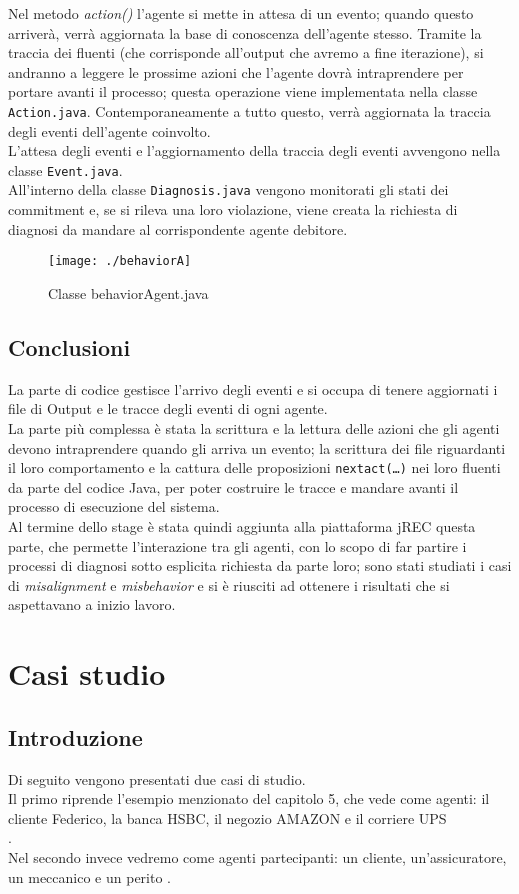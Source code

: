 \documentclass[a4paper,12pt]{report}
\begin{document}
Nel metodo \textit{action()} l'agente si mette in attesa di un evento; quando questo arriverà, verrà aggiornata la base di conoscenza dell'agente stesso. Tramite la traccia dei fluenti (che corrisponde all'output che avremo a fine iterazione), si andranno a leggere le prossime azioni che l'agente dovrà intraprendere per portare avanti il processo; questa operazione viene implementata nella classe \texttt{Action.java}. Contemporaneamente a tutto questo, verrà aggiornata la traccia degli eventi dell'agente coinvolto.\\
L'attesa degli eventi e l'aggiornamento della traccia degli eventi avvengono nella classe \texttt{Event.java}.\\
All'interno della classe \texttt{Diagnosis.java} vengono monitorati gli stati dei commitment e, se si rileva una loro violazione, viene creata la richiesta di diagnosi da mandare al corrispondente agente debitore.
\newpage
\begin{figure}[h]
    \texttt{[image: ./behaviorA]}
    \caption{Classe behaviorAgent.java}
    \label{output}
\end{figure}
\newpage
\section{Conclusioni}
La parte di codice gestisce l'arrivo degli eventi e si occupa di tenere aggiornati i file di Output e le tracce degli eventi di ogni agente.\\
La parte più complessa è stata la scrittura e la lettura delle azioni che gli agenti devono intraprendere quando gli arriva un evento; la scrittura dei file riguardanti il loro comportamento e la cattura delle proposizioni \texttt{nextact(\dots)} nei loro fluenti da parte del codice Java, per poter costruire le tracce e mandare avanti il processo di esecuzione del sistema.\\
Al termine dello stage è stata quindi aggiunta alla piattaforma jREC questa parte, che permette l'interazione tra gli agenti, con lo scopo di far partire i processi di diagnosi sotto esplicita richiesta da parte loro; sono stati studiati i casi di \textit{misalignment} e \textit{misbehavior} e si è riusciti ad ottenere i risultati che si aspettavano a inizio lavoro.
\chapter{Casi studio}
\section{Introduzione}
Di seguito vengono presentati due casi di studio.\\
Il primo riprende l'esempio menzionato del capitolo 5, che vede come agenti: il cliente Federico, la banca HSBC, il negozio AMAZON e il corriere UPS\\\cite{rif5}.\\
Nel secondo invece vedremo come agenti partecipanti: un cliente, un'assicuratore, un meccanico e un perito \cite{rif6}.
\end{document}
